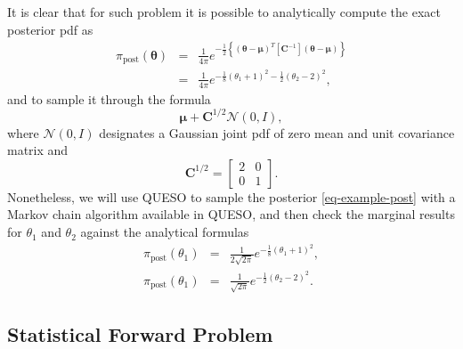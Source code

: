 It is clear that for such problem it is possible to analytically compute the exact posterior pdf as
\begin{eqnarray*}
\pi_{\text{post}}(\boldsymbol{\theta}) & = & \frac{1}{4\pi} e^{-\frac{1}{2}\left\{(\boldsymbol{\theta}-\boldsymbol{\mu})^T[\mathbf{C}^{-1}](\boldsymbol{\theta}-\boldsymbol{\mu})\right\}} \\
                                       & = & \frac{1}{4\pi} e^{-\frac{1}{8}(\theta_1+1)^2 - \frac{1}{2}(\theta_2-2)^2}, \label{eq-example-exact-joint}
\end{eqnarray*}
and to sample it through the formula
\begin{equation*}
\boldsymbol{\mu}+\mathbf{C}^{1/2}\mathcal{N}(0,I),
\end{equation*}
where $\mathcal{N}(0,I)$ designates a Gaussian joint pdf of zero mean and unit covariance matrix
and
\begin{equation*}
\mathbf{C}^{1/2} = 
\left[
\begin{array}{cc}
2 & 0 \\
0 & 1
\end{array}
\right].
\end{equation*}
Nonetheless, we will use QUESO to sample the posterior \eqref{eq-example-post}
with a Markov chain algorithm available in QUESO, and
then check the marginal results for $\theta_1$ and $\theta_2$ against the analytical formulas
\begin{eqnarray*}
\pi_{\text{post}}(\theta_1) & = & \frac{1}{2\sqrt{2\pi}} e^{-\frac{1}{8}(\theta_1+1)^2}, \label{eq-example-exact-marg-1}\\
\pi_{\text{post}}(\theta_1) & = & \frac{1}{ \sqrt{2\pi}} e^{-\frac{1}{2}(\theta_2-2)^2}. \label{eq-example-exact-marg-2}
\end{eqnarray*}

\subsection{Statistical Forward Problem}

